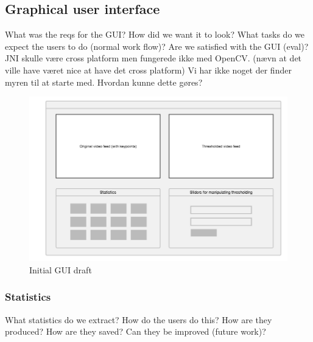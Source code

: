 
\subsection{Graphical user interface}

What was the reqs for the GUI?
How did we want it to look?
What tasks do we expect the users to do (normal work flow)?
Are we satisfied with the GUI (eval)?
JNI skulle være cross platform men fungerede ikke med OpenCV.
(nævn at det ville have været nice at have det cross platform)
Vi har ikke noget der finder myren til at starte med. Hvordan kunne dette gøres?

\begin{figure}[!ht]
    \centering
    \includegraphics[scale = 0.3]{img/termes_gui.png}
    \caption{Initial GUI draft}
\end{figure}

\subsubsection{Statistics} \mbox{}\par
What statistics do we extract?
How do the users do this?
How are they produced?
How are they saved?
Can they be improved (future work)?

